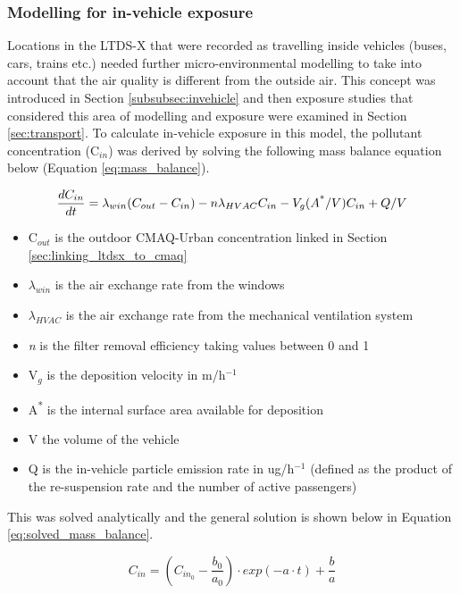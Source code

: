         \subsubsection{Modelling for in-vehicle exposure}
        \label{sec:in_vehicle_modelling}

Locations in the LTDS-X that were recorded as travelling inside vehicles (buses, cars, trains etc.) needed further micro-environmental modelling to take into account that the air quality is different from the outside air. This concept was introduced in Section \ref{subsubsec:invehicle} and then exposure studies that considered this area of modelling and exposure were examined in Section \ref{sec:transport}. To calculate in-vehicle exposure in this model, the pollutant concentration (C$_{in}$) was derived by solving the following mass balance equation below (Equation \ref{eq:mass_balance}).

\begin{equation}
\frac{dC_{in}}{dt} = \lambda _{win} (C_{out} - C_{in}) - n\lambda _{HVAC} C_{in} - V_{g} (A\textsuperscript{*}/V) C_{in} + Q/V
\label{eq:mass_balance}
\end{equation}

\begin{itemize}
\item C$_{out}$ is the outdoor CMAQ-Urban concentration linked in Section \ref{sec:linking_ltdsx_to_cmaq}
\item $\lambda _{win}$ is the air exchange rate from the windows
\item $\lambda _{HV AC}$ is the air exchange rate from the  mechanical ventilation system
\item \textit{n} is the filter removal efficiency taking values between 0 and 1
\item V$_{g}$ is the deposition velocity in m/h$^{-1}$
\item A\textsuperscript{*} is the internal surface area available for deposition
\item V the volume of the vehicle
\item Q is the in-vehicle particle emission rate in ug/h$^{-1}$ (defined as the product of the re-suspension rate and the number of active passengers)
\end{itemize}

This was solved analytically and the general solution is shown below in Equation \ref{eq:solved_mass_balance}.

\begin{equation}
C_{in} = (C_{in_{0}} - \frac{b_{0}}{a_{0}}) \cdot exp(-a \cdot t) + \frac{b}{a}
\label{eq:solved_mass_balance}
\end{equation}


